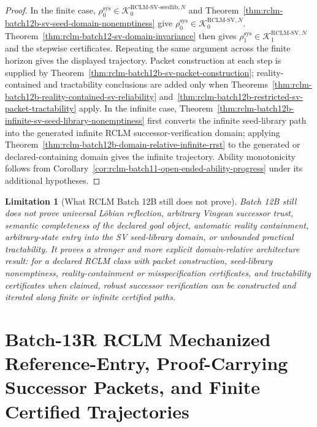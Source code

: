 \documentclass[11pt,a4paper]{article}
\newtheorem{limitation}[theorem]{Limitation}
\newcommand{\Kcal}{\mathcal K}
\newcommand{\RCLM}{\mathrm{RCLM}}
\newcommand{\sys}{\mathrm{sys}}
\begin{document}
\begin{proof}
In the finite case, \(\rho_0^{\sys}\in\Kcal_0^{\RCLM\text{-}\mathrm{SV\mbox{-}seedlib},N}\) and Theorem~\ref{thm:rclm-batch12b-sv-seed-domain-nonemptiness} give \(\rho_0^{\sys}\in\Kcal_0^{\RCLM\text{-}\mathrm{SV},N}\). Theorem~\ref{thm:rclm-batch12-sv-domain-invariance} then gives \(\rho_1^{\sys}\in\Kcal_1^{\RCLM\text{-}\mathrm{SV},N}\) and the stepwise certificates. Repeating the same argument across the finite horizon gives the displayed trajectory. Packet construction at each step is supplied by Theorem~\ref{thm:rclm-batch12b-sv-packet-construction}; reality-contained and tractability conclusions are added only when Theorems~\ref{thm:rclm-batch12b-reality-contained-sv-reliability} and~\ref{thm:rclm-batch12b-restricted-sv-packet-tractability} apply. In the infinite case, Theorem~\ref{thm:rclm-batch12b-infinite-sv-seed-library-nonemptiness} first converts the infinite seed-library path into the generated infinite RCLM successor-verification domain; applying Theorem~\ref{thm:rclm-batch12b-domain-relative-infinite-rrst} to the generated or declared-containing domain gives the infinite trajectory. Ability monotonicity follows from Corollary~\ref{cor:rclm-batch11-open-ended-ability-progress} under its additional hypotheses.
\end{proof}

\begin{limitation}[What RCLM Batch 12B still does not prove]
\label{lim:rclm-batch12b-remaining-limitations}
Batch 12B still does not prove universal L\"obian reflection, arbitrary Vingean successor trust, semantic completeness of the declared goal object, automatic reality containment, arbitrary-state entry into the SV seed-library domain, or unbounded practical tractability. It proves a stronger and more explicit domain-relative architecture result: for a declared RCLM class with packet construction, seed-library nonemptiness, reality-containment or misspecification certificates, and tractability certificates when claimed, robust successor verification can be constructed and iterated along finite or infinite certified paths.
\end{limitation}

\section{Batch-13R RCLM Mechanized Reference-Entry, Proof-Carrying Successor Packets, and Finite Certified Trajectories}
\label{sec:rclm-batch13r-reference-entry-proof-carrying}
\end{document}
